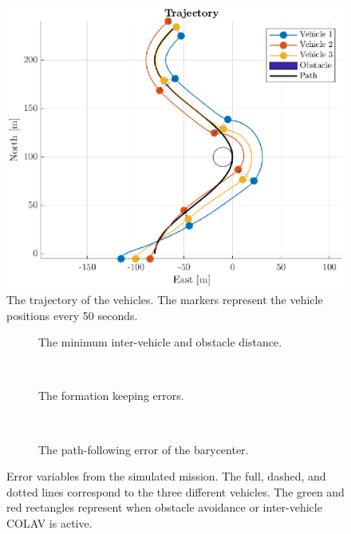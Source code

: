 \begin{figure}[ht]
    \centering
    \includegraphics[width=.8\textwidth]{figures/sim-three-agent-general/plot3d-trajectory.eps}
    \vspace*{-4mm}
    \caption{The trajectory of the vehicles. The markers represent the vehicle positions every 50 seconds.}
    \label{fig:plot3d-general-mission}
    \vspace{-4mm}
\end{figure}


\begin{figure}[htbp]
    \centering
    \begin{subfigure}[t]{.9\textwidth}
    \centering
    \setlength{}
    \setlength\figureheight{3cm}
    
    \vspace*{-2mm}
    \caption{The minimum inter-vehicle and obstacle distance.}
    \label{fig:collision_avoidance}
    \end{subfigure}
    \\
    \begin{subfigure}[t]{.9\textwidth}
    \centering
    \setlength{}
    \setlength\figureheight{3.3cm}
    
    \vspace*{-2mm}
    \caption{The formation keeping errors. }
    \label{fig:formation_keeping_error}
    \end{subfigure}
    \\
    \begin{subfigure}[t]{.9\textwidth}
    \centering
    \setlength{}
    \setlength\figureheight{3cm}
    
    \vspace*{-2mm}
    \caption{The path-following error of the barycenter.}
    \label{fig:path_following_error}
    \end{subfigure}
    \vspace*{-2mm}
    \caption{Error variables from the simulated mission. The full, dashed, and dotted lines correspond to the three different vehicles. The green and red rectangles represent when obstacle avoidance or inter-vehicle COLAV is active.}
    \label{fig:sim_results}
\end{figure}

